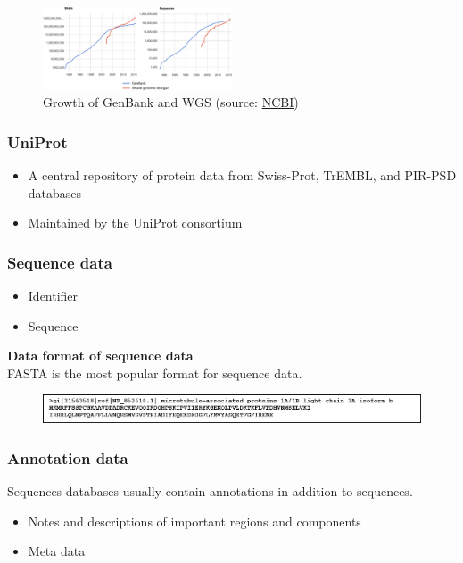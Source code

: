 \begin{figure}[H]
  \centering
      \includegraphics[width=0.5\textwidth]{fig05/genebank_stat.png}
  \caption{Growth of GenBank and WGS (source: \href{http://www.ncbi.nlm.nih.gov/genbank/statistics}{NCBI})}
\end{figure}

%
%
\subsubsection*{UniProt} 
\begin{itemize}
\item A central repository of protein data from Swiss-Prot, TrEMBL, and PIR-PSD databases
\item Maintained by the UniProt consortium
\end{itemize}

%
%
\subsubsection*{Sequence data} 
\begin{itemize}
\item Identifier
\item Sequence
\end{itemize}

\noindent
\textbf{Data format of sequence data} \\
FASTA is the most popular format for sequence data.
\begin{figure}[H]
  \centering
      \includegraphics[width=\textwidth]{fig05/fasta.png}
\end{figure}

%
%
\subsubsection*{Annotation data} 
Sequences databases usually contain annotations in addition to sequences. 

\begin{itemize}
\item Notes and descriptions of important regions and components
\item Meta data
\end{itemize}

